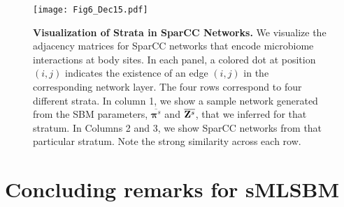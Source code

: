 \begin{figure}
\begin{center}
\texttt{[image: Fig6\_Dec15.pdf]}
\caption{{\bf Visualization of Strata in SparCC Networks.} We visualize the adjacency matrices for SparCC networks that encode microbiome interactions at body sites. In each panel, a colored dot at position $(i,j)$ indicates the existence of an edge $(i,j)$ in the corresponding network layer. The four rows correspond to four different strata. In column 1, we show a sample network generated from the SBM parameters, $\overline{{\boldsymbol \pi}^{s}}$ and $\overline{{\bf Z}^{s}}$, that we inferred for that stratum. In Columns 2 and 3, we show SparCC networks from that particular stratum. Note the strong similarity across each row.}
\label{sampleNet}
\end{center}
\end{figure}

\section{Concluding remarks for sMLSBM}

